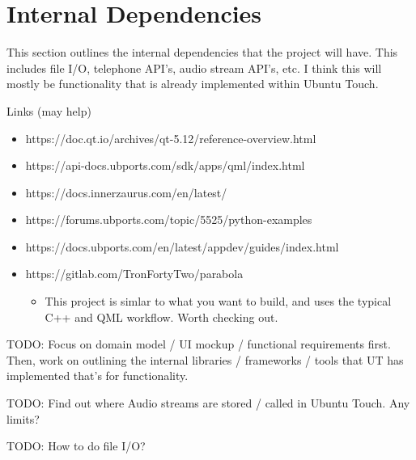 \section{Internal Dependencies}

This section outlines the internal dependencies that the project will have. This includes file I/O, telephone API's, audio stream API's, etc. I think this will mostly be functionality that is already implemented within Ubuntu Touch.

Links (may help)
\begin{itemize}
	\item https://doc.qt.io/archives/qt-5.12/reference-overview.html
	\item https://api-docs.ubports.com/sdk/apps/qml/index.html
	\item https://docs.innerzaurus.com/en/latest/
	\item https://forums.ubports.com/topic/5525/python-examples
	\item https://docs.ubports.com/en/latest/appdev/guides/index.html
	\item https://gitlab.com/TronFortyTwo/parabola
	\begin{itemize}
		\item This project is simlar to what you want to build, and uses the typical C++ and QML workflow. Worth checking out.
	\end{itemize}
\end{itemize}


TODO: Focus on domain model / UI mockup / functional requirements first. Then, work on outlining the internal libraries / frameworks / tools that UT has implemented that's for functionality.

TODO: Find out where Audio streams are stored / called in Ubuntu Touch. Any limits?

TODO: How to do file I/O?

